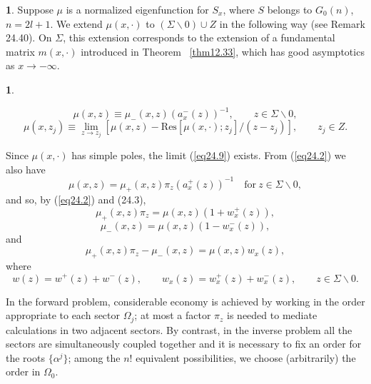 \documentclass{surv-l}
\theoremstyle{plain}
\theoremstyle{definition}
\newtheorem{definition}[theorem]{\sc{Definition}}
\numberwithin{equation}{chapter}
\begin{document}
\begin{definition}
Suppose $\mu$ is a normalized eigenfunction for $S_{x}$, where $S$ belongs to $G_{0}(n)$, $n=2l+1$. We extend $\mu(x, \cdot)$ to $(\Sigma\backslash 0)\cup Z$ in the following way (see Remark 24.40). On $\Sigma$, this extension corresponds to the extension of a fundamental matrix $m(x, \cdot)$ introduced in Theorem ~\ref{thm12.33}, which has good asymptotics as $ x\rightarrow-\infty$.
\end{definition}



\setcounter{theorem}{6}

\begin{definition}\label{defi24.7}

\renewcommand{\theequation}{\thesection.\arabic{equation}}
\setcounter{section}{24}
\setcounter{equation}{7}
\begin{equation}\label{eq24.8}
\mu(x, z)\equiv\mu_{-}(x,z)(a_{x}^{-}(z))^{-1},\qquad z\in\Sigma\backslash 0,
\end{equation}
\begin{equation}\label{eq24.9}
\mu(x, z_{j})\equiv\lim_{z\rightarrow z_{j}}[\mu(x,z)-\mathrm{Res}[\mu(x, \cdot);z_{j}]/(z-z_{j})],\qquad z_{j}\in  Z.
\end{equation}

Since $\mu(x, \cdot)$ has simple poles, the limit (\ref{eq24.9}) exists. From (\ref{eq24.2}) we also have
\begin{equation}\label{eq24.10}
\mu(x, z)=\mu_{+}(x, z)\pi_{z}(a_{x}^{+}(z))^{-1}\quad \mathrm{for}\ z\in\Sigma\backslash 0,
\end{equation}
and so, by (\ref{eq24.2}) and (24.3),
\setcounter{equation}{10}
\begin{equation}\label{eq24.11}
\mu_{+}(x, z)\pi_{z} = \mu(x, z)(1+w_{x}^{+}(z)),
\end{equation}
\begin{equation}\label{eq24.12}
\mu_{-}(x, z) = \mu(x, z)(1-w_{x}^{-}(z)),
\end{equation}
and
\begin{equation}\label{eq24.13}
\mu_{+}(x,z)\pi_{z}-\mu_{-}(x, z)=\mu(x, z)w_{x}(z),
\end{equation}
where
\begin{equation}\label{eq24.14}
w(z)=w^{+}(z)+w^{-}(z),\qquad w_{x}(z)=w_{x}^{+}(z)+w_{x}^{-}(z),\qquad z\in\Sigma\backslash 0.
\end{equation}

In the forward problem, considerable economy is achieved by working in the order appropriate to each sector $\Omega_{j}$; at most a factor $\pi_{z}$ is needed to mediate calculations in two adjacent sectors. By contrast, in the inverse problem all the sectors are simultaneously coupled together and it is necessary to fix an order for the roots $\{\alpha^{j}\}$; among the $n!$ equivalent possibilities, we choose (arbitrarily) the order in $\Omega_{0}$.
\end{definition}
\end{document}
